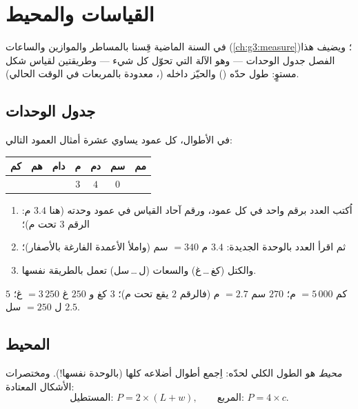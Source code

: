 \chapter{القياسات والمحيط}\label{ch:g4:measure}

في السنة الماضية قِسنا بالمساطر والموازين والساعات
(\cref{ch:g3:measure})؛ ويضيف هذا الفصل جدول الوحدات --- وهو
الآلة التي تحوّل كل شيء --- وطريقتين لقياس شكل مستوٍ:
طول حدّه () والحيّز داخله
(، معدودة بالمربعات في الوقت الحالي).

\section{جدول الوحدات}

\begin{method}\label{met:g4:measure:table}
في الأطوال، كل عمود يساوي عشرة أمثال العمود التالي:
\begin{center}
\renewcommand{\arraystretch}{1.3}
\begin{tabular}{c|c|c|c|c|c|c}
كم & هم & دام & م & دم & سم & مم \\
\hline
 & & & $3$ & $4$ & $0$ & \\
\end{tabular}
\end{center}
\begin{enumerate}
  \item اُكتب العدد برقم واحد في كل عمود، ورقم آحاد
        القياس في عمود وحدته (هنا $3.4$ م: الرقم $3$
        تحت م)؛
  \item ثم اقرأ العدد بالوحدة الجديدة: $3.4$ م $= 340$ سم (واملأ
        الأعمدة الفارغة بالأصفار)؛
  \item والكتل (كغ\,\dots\,غ) والسعات (ل\,\dots\,سل) تعمل
        بالطريقة نفسها.
\end{enumerate}
\end{method}

\begin{example}\label{ex:g4:measure:convert}
$5$ كم $= 5\,000$ م؛ \quad $270$ سم $= 2.7$ م (فالرقم $2$ يقع
تحت م)؛ \quad $3$ كغ و $250$ غ $= 3\,250$ غ؛ \quad
$2.5$ ل $= 250$ سل.
\end{example}

\section{المحيط}

\begin{definition}[المحيط]\label{def:g4:measure:perimeter}
\emph{محيط}  هو الطول الكلي
لحدّه: اِجمع أطوال أضلاعه كلها (بالوحدة نفسها!). ومختصرات
الأشكال المعتادة:
\[
\text{المستطيل: } P = 2 \times (L + w),
\qquad
\text{المربع: } P = 4 \times c .
\]
\end{definition}

